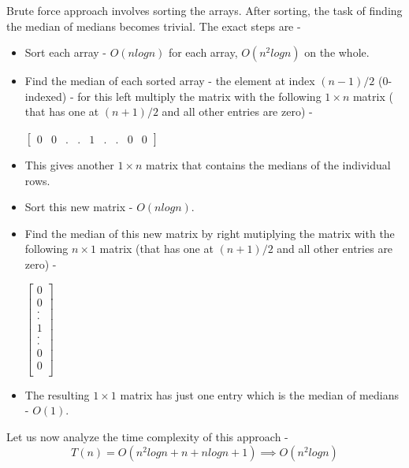\documentclass[journal,12pt,twocolumn]{IEEEtran}
\begin{document}
Brute force approach involves sorting the arrays. After sorting, the task of finding the median of medians becomes trivial.
The exact steps are - 
\begin{itemize}
    \item Sort each array - $O(nlogn)$ for each array, $O(n^{2}logn)$ on the whole.
    \item Find the median of each sorted array - the element at  index $(n-1)/2$ (0-indexed) - for this left multiply the matrix with the following $1 \times n$ matrix ( that has one at $(n+1)/2$ and all other entries are zero)  - 

    \begin{center}
        
        $
        \begin{bmatrix}
            0 & 0 & . & . & 1 & . & . & 0 & 0 
        \end{bmatrix}
        $
        
    \end{center}

    
    \item This gives another $1 \times n$ matrix that contains the medians of the individual rows. 
    \item Sort this new matrix - $O(nlogn)$.
    \item Find the median of this new matrix by right mutiplying the matrix with the following $n \times 1 $ matrix (that has one at $(n+1)/2$ and all other entries are zero) - 
    
    \begin{center}
        

        $
        \begin{bmatrix}
            0\\
            0\\
            .\\
            .\\
            1\\
            .\\
            .\\
            0\\
            0\\
        \end{bmatrix}
        $
      
    \end{center}

    \item The resulting $1\times1$ matrix has just one entry which is the median of medians - $O(1)$.
\end{itemize}
Let us now analyze the time complexity of this approach - 
    \begin{equation}
    T(n) = O(n^{2}logn + n + nlogn + 1) \label{eq:runtime_naive}
    \implies O(n^{2}logn)
    \end{equation}
\end{document}
